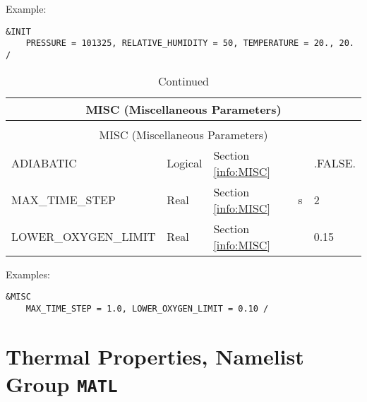\noindent Example:
\begin{lstlisting}
&INIT
	PRESSURE = 101325, RELATIVE_HUMIDITY = 50, TEMPERATURE = 20., 20. /
\end{lstlisting}


\begin{longtable}{@{\extracolsep{\fill}}|l|l|l|l|l|}
\caption[Miscellaneous Parameters ({\ct MISC} namelist group)]{For more information see Section~\ref{info:MISC}.}
\label{tbl:MISC} \\
\hline
\multicolumn{5}{|c|}{{\ct MISC} (Miscellaneous Parameters)} \\
\hline \hline
\endfirsthead
\caption[]{Continued} \\
\hline
\multicolumn{5}{|c|}{{\ct MISC} (Miscellaneous Parameters)} \\
\hline \hline
\endhead
{\ct ADIABATIC}            & Logical     & Section \ref{info:MISC}                 &           & {\ct .FALSE.}  \\ \hline
{\ct MAX\_TIME\_STEP}      & Real        & Section \ref{info:MISC}                 & s         &   2            \\ \hline
{\ct LOWER\_OXYGEN\_LIMIT} & Real        & Section \ref{info:MISC}                 &           &   0.15          \\ \hline
\end{longtable}

\noindent Examples:
\begin{lstlisting}
&MISC
	MAX_TIME_STEP = 1.0, LOWER_OXYGEN_LIMIT = 0.10 /
\end{lstlisting}




\clearpage
\section{Thermal Properties, Namelist Group \texorpdfstring{{\tt MATL}}{MATL}}


